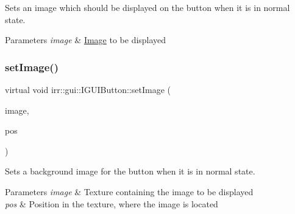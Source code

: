 Sets an image which should be displayed on the button when it is in normal state. 


\begin{DoxyParams}{Parameters}
{\em image} & \hyperlink{classImage}{Image} to be displayed \\
\hline
\end{DoxyParams}
\mbox{\label{classirr_1_1gui_1_1IGUIButton_a205490ec6b4978afe9d3f6a4aed92b50}} 
\subsubsection{\texorpdfstring{set\+Image()}{setImage()}\hspace{0.1cm}{\footnotesize\ttfamily [3/4]}}
{\footnotesize\ttfamily virtual void irr\+::gui\+::\+I\+G\+U\+I\+Button\+::set\+Image (\begin{DoxyParamCaption}\item[{\hyperlink{classirr_1_1video_1_1ITexture}{video\+::\+I\+Texture} $\ast$}]{image,  }\item[{const \hyperlink{classirr_1_1core_1_1rect}{core\+::rect}$<$ \hyperlink{namespaceirr_ac66849b7a6ed16e30ebede579f9b47c6}{s32} $>$ \&}]{pos }\end{DoxyParamCaption})\hspace{0.3cm}{\ttfamily [pure virtual]}}



Sets a background image for the button when it is in normal state. 


\begin{DoxyParams}{Parameters}
{\em image} & Texture containing the image to be displayed \\
\hline
{\em pos} & Position in the texture, where the image is located \\
\hline
\end{DoxyParams}
\mbox{\label{classirr_1_1gui_1_1IGUIButton_a205490ec6b4978afe9d3f6a4aed92b50}} 

